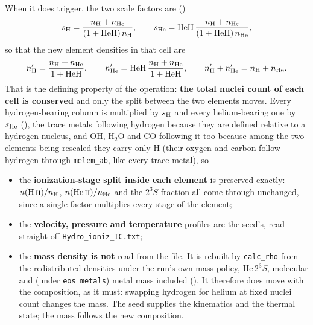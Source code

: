 \documentclass[english,a4paper]{my_memo}
\begin{document}
When it does trigger, the two scale factors are
()
%
\begin{equation}
  s_{\rm H} = \frac{n_{\rm H} + n_{\rm He}}
                   {(1 + \mathrm{HeH})\, n_{\rm H}},
  \qquad
  s_{\rm He} = \mathrm{HeH}\,
               \frac{n_{\rm H} + n_{\rm He}}
                    {(1 + \mathrm{HeH})\, n_{\rm He}},
  \label{eq:scales}
\end{equation}
%
so that the new element densities in that cell are
%
\begin{equation}
  n'_{\rm H} = \frac{n_{\rm H} + n_{\rm He}}{1 + \mathrm{HeH}},
  \qquad
  n'_{\rm He} = \mathrm{HeH}\,\frac{n_{\rm H} + n_{\rm He}}
                                   {1 + \mathrm{HeH}},
  \qquad
  n'_{\rm H} + n'_{\rm He} = n_{\rm H} + n_{\rm He}.
  \label{eq:conserve}
\end{equation}
%
That is the defining property of the operation: \textbf{the total nuclei
count of each cell is conserved} and only the split between the two elements
moves. Every hydrogen-bearing column is multiplied by $s_{\rm H}$ and every
helium-bearing one by $s_{\rm He}$
(), the trace metals following hydrogen because
they are defined relative to a hydrogen nucleus, and OH, H$_2$O and CO
following it too because among the two elements being rescaled they carry
only H (their oxygen and carbon follow hydrogen through \verb|melem_ab|,
like every trace metal), so
%
\begin{itemize}
\item the \textbf{ionization-stage split inside each element} is preserved
  exactly: $n(\mathrm{H\,\textsc{ii}})/n_{\rm H}$,
  $n(\mathrm{He\,\textsc{ii}})/n_{\rm He}$ and the $2^3S$ fraction all come
  through unchanged, since a single factor multiplies every stage of the
  element;
\item the \textbf{velocity, pressure and temperature} profiles are the
  seed's, read straight off \verb|Hydro_ioniz_IC.txt|;
\item the \textbf{mass density is not} read from the file. It is rebuilt by
  \verb|calc_rho| from the redistributed densities under the run's own mass
  policy, He\,$2^3S$, molecular and (under \verb|eos_metals|) metal mass
  included (). It therefore does move with the
  composition, as it must: swapping hydrogen for helium at fixed nuclei
  count changes the mass. The seed supplies the kinematics and the thermal
  state; the mass follows the new composition.
\end{itemize}
\end{document}
